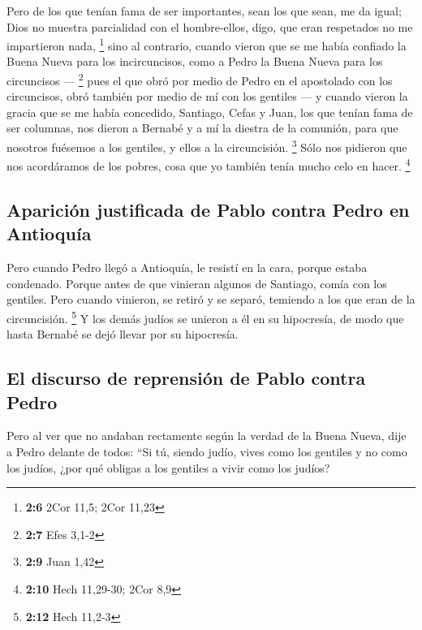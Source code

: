  Pero de los que tenían fama de ser importantes, sean los
que sean, me da igual; Dios no muestra parcialidad con el hombre-ellos,
digo, que eran respetados no me impartieron nada, \footnote{\textbf{2:6}
  2Cor 11,5; 2Cor 11,23}  sino al contrario, cuando vieron
que se me había confiado la Buena Nueva para los incircuncisos, como a
Pedro la Buena Nueva para los circuncisos --- \footnote{\textbf{2:7}
  Efes 3,1-2}  pues el que obró por medio de Pedro en el
apostolado con los circuncisos, obró también por medio de mí con los
gentiles ---  y cuando vieron la gracia que se me había
concedido, Santiago, Cefas y Juan, los que tenían fama de ser columnas,
nos dieron a Bernabé y a mí la diestra de la comunión, para que nosotros
fuésemos a los gentiles, y ellos a la circuncisión. \footnote{\textbf{2:9}
  Juan 1,42}  Sólo nos pidieron que nos acordáramos de
los pobres, cosa que yo también tenía mucho celo en hacer. \footnote{\textbf{2:10}
  Hech 11,29-30; 2Cor 8,9}

\hypertarget{apariciuxf3n-justificada-de-pablo-contra-pedro-en-antioquuxeda}{%
\subsection{Aparición justificada de Pablo contra Pedro en
Antioquía}\label{apariciuxf3n-justificada-de-pablo-contra-pedro-en-antioquuxeda}}

 Pero cuando Pedro llegó a Antioquía, le resistí en la
cara, porque estaba condenado.  Porque antes de que
vinieran algunos de Santiago, comía con los gentiles. Pero cuando
vinieron, se retiró y se separó, temiendo a los que eran de la
circuncisión. \footnote{\textbf{2:12} Hech 11,2-3}  Y los
demás judíos se unieron a él en su hipocresía, de modo que hasta Bernabé
se dejó llevar por su hipocresía.

\hypertarget{el-discurso-de-reprensiuxf3n-de-pablo-contra-pedro}{%
\subsection{El discurso de reprensión de Pablo contra
Pedro}\label{el-discurso-de-reprensiuxf3n-de-pablo-contra-pedro}}

 Pero al ver que no andaban rectamente según la verdad de
la Buena Nueva, dije a Pedro delante de todos: ``Si tú, siendo judío,
vives como los gentiles y no como los judíos, ¿por qué obligas a los
gentiles a vivir como los judíos?

